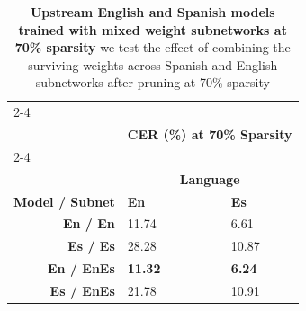 \begin{table}
\centering
\begin{tabular}{llll}
\cline{2-4} \\[-1.5ex] 
 & \multicolumn{3}{c}{\textbf{CER (\%) at 70\% Sparsity }} \\ \cline{2-4}{} \\[-1.5ex]
 & \multicolumn{3}{c}{\textbf{Language}} \\[0.5ex] \hline
\multicolumn{1}{l|}{\textbf{Model / Subnet}} & \multicolumn{1}{l}{\textbf{En}} & \multicolumn{1}{l}{} & \multicolumn{1}{l}{\textbf{Es}}  \\ \hline
\multicolumn{1}{r|}{\textbf{En / En}} & \multicolumn{1}{l}{11.74} & \multicolumn{1}{l}{} & \multicolumn{1}{l}{6.61}   \\ %
\multicolumn{1}{r|}{\textbf{Es / Es}} & \multicolumn{1}{l}{28.28} & \multicolumn{1}{l}{} & \multicolumn{1}{l}{10.87}  \\ %
\multicolumn{1}{r|}{\textbf{En / EnEs}} & \multicolumn{1}{l}{\textbf{11.32}} & \multicolumn{1}{l}{} &\multicolumn{1}{l}{\textbf{6.24}} \\ %
\multicolumn{1}{r|}{\textbf{Es / EnEs}} & \multicolumn{1}{l}{21.78} & \multicolumn{1}{l}{} & \multicolumn{1}{l}{10.91}   \\ \hline 
\end{tabular}
\caption{\textbf{Upstream English and Spanish models trained with mixed weight subnetworks at 70\% sparsity} we test the effect of combining the surviving weights across Spanish and English subnetworks after pruning at 70\% sparsity}%
\label{app_tab:70perc_EnglishSpanish_Mixed_Mask}
\end{table}

